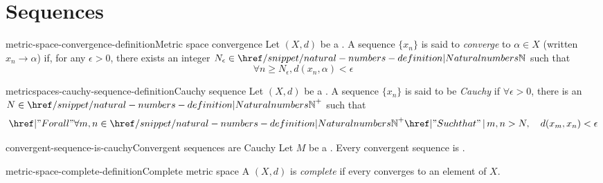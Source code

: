 \documentclass[preview]{standalone}
\begin{document}
\genpage

\section{Sequences}

\begin{snippetdefinition}{metric-space-convergence-definition}{Metric space convergence}
    Let \((X, d)\) be a \metricspace.
    A sequence \(\{x_n\}\) is said to \textit{converge}
    to \(\alpha \in X\) (written \(x_n\to\alpha\)) if, for any \(\epsilon > 0\),
    there exists an integer \(N_\epsilon \in \naturalnumbers\) such that
    \[\forall n \geq N_\epsilon, d(x_n, \alpha) < \epsilon\]
\end{snippetdefinition}


\begin{snippetdefinition}{metricspaces-cauchy-sequence-definition}{Cauchy sequence}
    Let \((X, d)\) be a \metricspace.
    A sequence \(\{x_n\}\) is said to be \textit{Cauchy}
    if \(\forall \epsilon > 0\), there is an \(N\in{\naturalnumbers}^+\)
    such that \[ \forall m,n \in {\naturalnumbers}^+ \suchthat m,n > N, \quad d(x_m, x_n) < \epsilon \]
\end{snippetdefinition}


\begin{snippetproposition}{convergent-sequence-is-cauchy}{Convergent sequences are Cauchy}
    Let \(M\) be a \metricspace.
    Every convergent sequence is \mscauchy.
\end{snippetproposition}

\begin{snippetdefinition}{metric-space-complete-definition}{Complete metric space}
    A \metricspace \((X, d)\) is \textit{complete} if every 
    converges to an element of \(X\).
\end{snippetdefinition}

\end{document}
